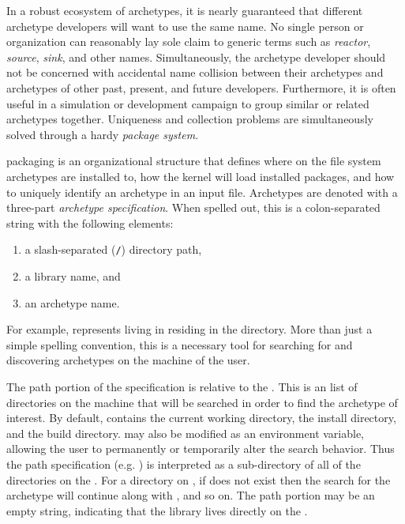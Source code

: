 In a robust ecosystem of archetypes, it is nearly guaranteed that different archetype
developers will want to use the same name. No single person or organization can
reasonably lay sole claim to generic terms such as \emph{reactor}, \emph{source},
\emph{sink}, and other names. Simultaneously, the archetype developer should not
be concerned with accidental name collision between their archetypes and archetypes
of other
past, present, and future developers.  Furthermore, it is often useful in a
simulation or
development campaign to group similar or related archetypes together. Uniqueness
and collection problems are simultaneously solved through a hardy \emph{package system}.

\cyclus packaging is an organizational structure that defines where on the file system
archetypes are installed to, how the \cyclus kernel will load installed
packages, and how to uniquely identify an archetype in an input file.  Archetypes
are denoted with a three-part \emph{archetype specification}. When spelled out, this
is a colon-separated string with the following elements:
\begin{enumerate}
    \item a slash-separated (\texttt{/}) directory path,
    \item a library name, and
    \item an archetype name.
\end{enumerate}
For example,  represents  living
in  residing in the  directory. More than just
a simple spelling convention, this is a necessary
tool for searching for and discovering archetypes on the machine of the user.

The path portion of the specification is relative to the . This is
an list of directories on the machine that will be searched in order to find the
archetype of interest. By default,  contains the current working
directory, the \cyclus install directory, and the \cyclus build directory.
 may also be modified as an environment variable, allowing the user
to permanently or temporarily alter the \cyclus search behavior.  Thus the path
specification (e.g. ) is interpreted as a sub-directory of all of
the directories on the . For a directory  on
, if   does not exist then the search for
the archetype will continue along with , and so on. The path portion
may be an empty string, indicating that the library lives directly on the
.

